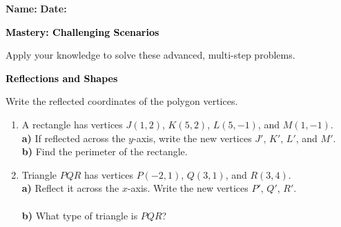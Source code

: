 \documentclass[12pt, letterpaper, fleqn]{article}
\begin{document}
\textbf{Name:} \underline{\hspace{5cm}}
\hfill
\textbf{Date:} \underline{\hspace{3cm}}\\

\begin{tcolorbox}[colback=black!10]
    \large\textcolor{black}{\textbf{Mastery: Challenging Scenarios}}
\end{tcolorbox}

\vspace{3mm}
\noindent
Apply your knowledge to solve these advanced, multi-step problems.

\vspace{4mm}

\begin{tcolorbox}[colback=black!10]
\large\textcolor{black}{\textbf{Reflections and Shapes}}
\end{tcolorbox}

\noindent
Write the reflected coordinates of the polygon vertices.

\vspace{3mm}
\begin{enumerate}[itemsep=2.2cm, leftmargin=0.6cm]
\item A rectangle has vertices $J(1, 2)$, $K(5, 2)$, $L(5, -1)$, and $M(1, -1)$. \\
\textbf{a)} If reflected across the $y$-axis, write the new vertices $J'$, $K'$, $L'$, and $M'$. \vspace{2cm} \\
\textbf{b)} Find the perimeter of the rectangle. 

\vspace{0.4cm}

\item Triangle $PQR$ has vertices $P(-2, 1)$, $Q(3, 1)$, and $R(3, 4)$. \\
\textbf{a)} Reflect it across the $x$-axis. Write the new vertices $P'$, $Q'$, $R'$.  \\ \vspace{2cm} \\
\textbf{b)} What type of triangle is $PQR$? 

\vspace{2cm}

\end{enumerate}
\end{document}
